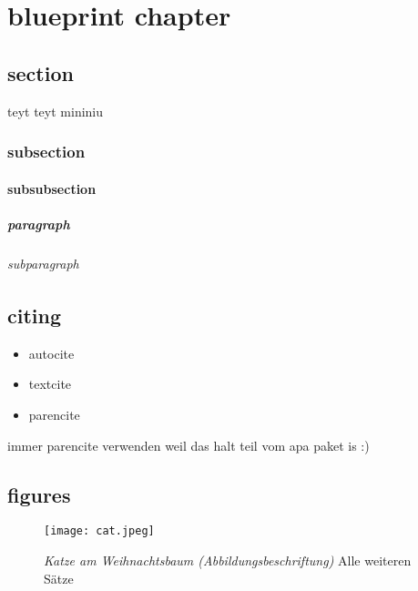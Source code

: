 \chapter{blueprint chapter}


\section{section}
teyt teyt mininiu
\subsection{subsection}

\lipsum[1]

\subsubsection{subsubsection}

\paragraph{paragraph}

\subparagraph{subparagraph}

\section{citing}
\begin{itemize}
  \item autocite  \autocite {zongker_chicken_2006}
  \item textcite  \textcite {zongker_chicken_2006}
  \item parencite \parencite{zongker_chicken_2006}
\end{itemize}

immer parencite verwenden weil das halt teil vom apa paket is :)

\section{figures}

\begin{figure}[tb]
  \centering
  \texttt{[image: cat.jpeg]} 
  \caption[Katze am Weihnachtsbaum (das steht im abbverzeichnis)]{
    \textit{Katze am Weihnachtsbaum (Abbildungsbeschriftung)}
    Alle weiteren Sätze
    }
  \label{fig:cat}
\end{figure}

